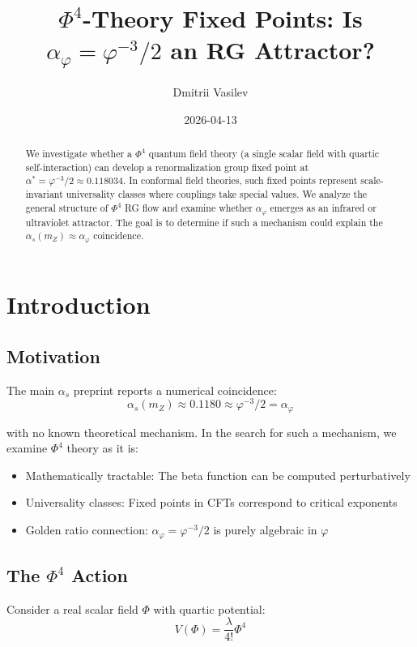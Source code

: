 \documentclass{article}
\title{$\Phi^4$-Theory Fixed Points: Is $\alpha_\varphi = \varphi^{-3}/2$ an RG Attractor?}
\author{Dmitrii Vasilev}
\date{2026-04-13}
\begin{document}
\maketitle

\begin{abstract}
We investigate whether a $\Phi^4$ quantum field theory (a single scalar field with quartic self-interaction) can develop a renormalization group fixed point at $\alpha^* = \varphi^{-3}/2 \approx 0.118034$. In conformal field theories, such fixed points represent scale-invariant universality classes where couplings take special values. We analyze the general structure of $\Phi^4$ RG flow and examine whether $\alpha_\varphi$ emerges as an infrared or ultraviolet attractor. The goal is to determine if such a mechanism could explain the $\alpha_s(m_Z) \approx \alpha_\varphi$ coincidence.
\end{abstract}

\section{Introduction}

\subsection{Motivation}

The main $\alpha_s$ preprint reports a numerical coincidence:
\begin{equation}
  \alpha_s(m_Z) \approx 0.1180 \approx \varphi^{-3}/2 = \alpha_\varphi
  \label{eq:coincidence}
\end{equation}

with no known theoretical mechanism. In the search for such a mechanism, we examine $\Phi^4$ theory as it is:
\begin{itemize}
  \item Mathematically tractable: The beta function can be computed perturbatively
  \item Universality classes: Fixed points in CFTs correspond to critical exponents
  \item Golden ratio connection: $\alpha_\varphi = \varphi^{-3}/2$ is purely algebraic in $\varphi$
\end{itemize}

\subsection{The $\Phi^4$ Action}

Consider a real scalar field $\Phi$ with quartic potential:
\begin{equation}
  V(\Phi) = \frac{\lambda}{4!}\Phi^4
  \label{eq:phi4-action}
\end{equation}
\end{document}
